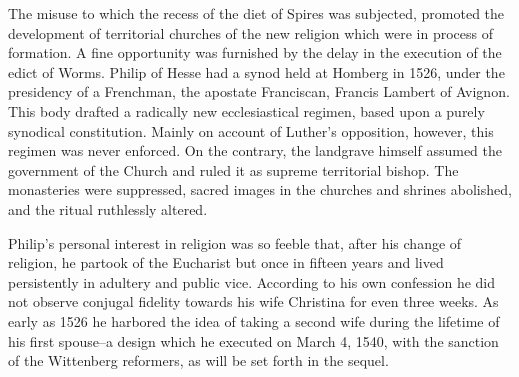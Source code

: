 The misuse to which the recess of the diet of Spires was subjected,
promoted the development of territorial churches of the new religion
which were in process of formation. A fine opportunity was furnished
by the delay in the execution of the edict of Worms. Philip
of Hesse had a synod held at Homberg in 1526, under the presidency
of a Frenchman, the apostate Franciscan, Francis Lambert of Avignon.
This body drafted a radically new ecclesiastical regimen, based upon a
purely synodical constitution. Mainly on account of Luther’s opposition,
however, this regimen was never enforced. On the contrary, the
landgrave himself assumed the government of the Church and ruled
it as supreme territorial bishop. The monasteries were suppressed,
sacred images in the churches and shrines abolished, and the ritual
ruthlessly altered.

Philip’s personal interest in religion was so feeble that, after his
change of religion, he partook of the Eucharist but once in fifteen
years and lived persistently in adultery and public vice. According
to his own confession he did not observe conjugal fidelity towards
his wife Christina for even three weeks. As early as 1526 he harbored
the idea of taking a second wife during the lifetime of his
first spouse--a design which he executed on March 4, 1540, with
the sanction of the Wittenberg reformers, as will be set forth in the
sequel.
